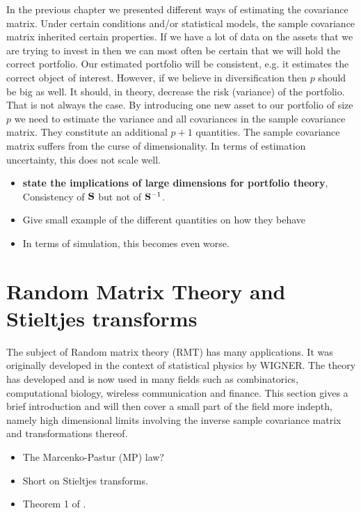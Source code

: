 \documentclass[]{book}\usepackage{knitr}
\begin{document}
In the previous chapter we presented different ways of estimating the covariance matrix. Under certain conditions and/or statistical models, the sample covariance matrix inherited certain properties. 
If we have a lot of data on the assets that we are trying to invest in then we can most often be certain that we will hold the correct portfolio.
Our estimated portfolio will be consistent, e.g. it estimates the correct object of interest. 
However, if we believe in diversification then $p$ should be big as well. 
It should, in theory, decrease the risk (variance) of the portfolio. 
That is not always the case.
By introducing one new asset to our portfolio of size $p$ we need to estimate the variance and all covariances in the sample covariance matrix. They constitute an additional $p+1$ quantities. 
The sample covariance matrix suffers from the curse of dimensionality. 
In terms of estimation uncertainty, this does not scale well. 

\begin{itemize}
  \item \textbf{state the implications of large dimensions for portfolio theory}, Consistency of $\mathbf{S}$ but not of $\mathbf{S}^{-1}$.
	\item Give small example of the different quantities on how they behave
	\item In terms of simulation, this becomes even worse.
\end{itemize}

\section{Random Matrix Theory and Stieltjes transforms}
The subject of Random matrix theory (RMT) has many applications. It was originally developed in the context of statistical physics by \citet{} WIGNER. The theory has developed and is now used in many fields such as combinatorics, computational biology, wireless communication and finance. This section gives a brief introduction and will then cover a small part of the field more indepth, namely high dimensional limits involving the inverse sample covariance matrix and transformations thereof. 





\begin{itemize}
  \item The Marcenko-Pastur (MP) law?
  \item Short on Stieltjes transforms.
	\item Theorem 1 of \citet{rubio2011spectral}.
\end{itemize}
\end{document}
